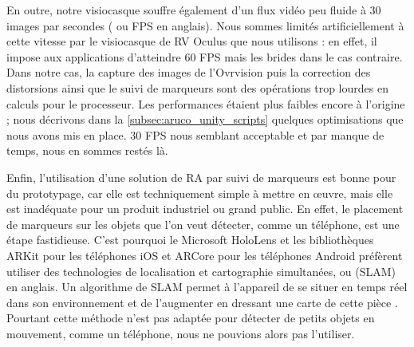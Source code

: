 
En outre, notre visiocasque souffre également d'un flux vidéo peu fluide à 30 images par secondes ( ou FPS en anglais). Nous sommes limités artificiellement à cette vitesse par le visiocasque de RV Oculus que nous utilisons : en effet, il impose aux applications d'atteindre 60 FPS mais les brides dans le cas contraire. Dans notre cas, la capture des images de l'Ovrvision puis la correction des distorsions ainsi que le suivi de marqueurs sont des opérations trop lourdes en calculs pour le processeur. Les performances étaient plus faibles encore à l'origine ; nous décrivons dans la \autoref{subsec:aruco_unity_scripts} quelques optimisations que nous avons mis en place. 30 FPS nous semblant acceptable et par manque de temps, nous en sommes restés là.


Enfin, l'utilisation d'une solution de RA par suivi de marqueurs est bonne pour du prototypage, car elle est techniquement simple à mettre en \oe uvre, mais elle est inadéquate pour un produit industriel ou grand public. En effet, le placement de marqueurs sur les objets que l'on veut détecter, comme un téléphone, est une étape fastidieuse. C'est pourquoi le Microsoft HoloLens et les bibliothèques ARKit pour les téléphones iOS et ARCore pour les téléphones Android préfèrent utiliser des technologies de localisation et cartographie simultanées, ou  (SLAM) en anglais. Un algorithme de SLAM permet à l'appareil de se situer en temps réel dans son environnement et de l'augmenter en dressant une carte de cette pièce . Pourtant cette méthode n'est pas adaptée pour détecter de petits objets en mouvement, comme un téléphone, nous ne pouvions alors pas l'utiliser.


